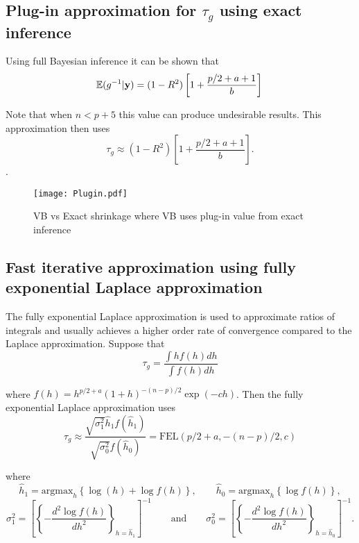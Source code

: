 \documentclass{article}
\def\vectorfontone{\bf}
\def\vy{{\vectorfontone y}}                      %
\def\bE{{\mathbb E}}                             %
\def\ds{\displaystyle}
\begin{document}
\subsection{Plug-in approximation for $\tau_g$ using exact inference}


\noindent Using full Bayesian inference it can be shown that
$$
\ds \bE(g^{-1}|\vy) = (1 -  R^2)\left[ 1 + \frac{p/2 + a + 1}{b}   \right] \\
$$

\noindent Note that when $n < p + 5$ this value can produce undesirable results.
This approximation then uses 
$$
\tau_g \approx (1 -  R^2)\left[ 1 + \frac{p/2 + a + 1}{b}   \right].
$$.

\begin{figure}[ht]
	\centering
	\texttt{[image: Plugin.pdf]}
	\caption{VB vs Exact shrinkage where VB uses plug-in value from exact inference}
	\label{fig:02}
\end{figure}



 

\newpage

\subsection{Fast iterative approximation using fully exponential Laplace
	approximation}


The fully exponential Laplace approximation is used to approximate 
ratios of integrals and usually achieves a higher order rate of convergence
compared to the Laplace approximation.
Suppose that
$$
\ds \tau_g = \frac{\ds \int h f(h) dh}{\ds \int f(h) dh}
$$

\noindent where $f(h) = h^{p/2 + a}(1+h)^{-(n-p)/2}\exp(-ch)$.
Then the fully exponential Laplace approximation uses
$$
\ds \tau_g \approx  \frac{\ds \sqrt{\sigma_1^2}\widehat{h}_1 f(\widehat{h}_1) }{\ds \sqrt{\sigma_0^2} f(\widehat{h}_0) } = \mbox{FEL}(p/2+a,-(n-p)/2,c)
$$

\noindent where
$$
\widehat{h}_1 = \mbox{argmax}_h \left\{\log(h) + \log f(h) \right\},
\qquad 
\widehat{h}_0 = \mbox{argmax}_h \left\{ \log f(h) \right\},
$$
$$
\sigma_1^2 = \left[\left\{ - \frac{d^2 \log f(h)}{d h^2}\right\}_{h = \widehat{h}_1} \right]^{-1}
\qquad \mbox{and} \qquad 
\sigma_0^2 = \left[\left\{ - \frac{d^2 \log f(h)}{d h^2}\right\}_{h = \widehat{h}_0} \right]^{-1}.
$$
\end{document}
